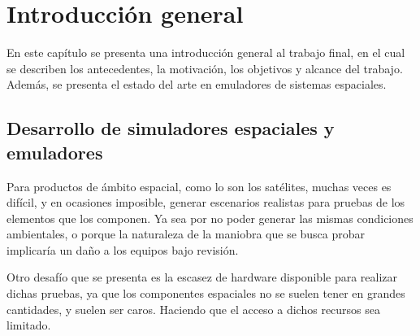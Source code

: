 
\chapter{Introducción general} %

\label{Chapter1} %
\label{IntroGeneral}


\newcommand{\keyword}[1]{\textbf{#1}}
\newcommand{\tabhead}[1]{\textbf{#1}}
\newcommand{\code}[1]{\texttt{#1}}
\newcommand{\file}[1]{\texttt{\bfseries#1}}
\newcommand{\option}[1]{\texttt{\itshape#1}}
\newcommand{\grados}{$^{\circ}$}


En este capítulo se presenta una introducción general al trabajo final, en el cual se describen los antecedentes, la motivación, los objetivos y alcance del trabajo. Además, se presenta el estado del arte en emuladores de sistemas espaciales.

\section{Desarrollo de simuladores espaciales y emuladores}
\label{sec:desarrollo_simuladores_emuladores}


Para productos de ámbito espacial, como lo son los satélites, muchas veces es difícil, y en ocasiones imposible, generar escenarios realistas para pruebas de los elementos que los componen. Ya sea por no poder generar las mismas condiciones ambientales, o porque la naturaleza de la maniobra que se busca probar implicaría un daño a los equipos bajo revisión.

Otro desafío que se presenta es la escasez de hardware disponible para realizar dichas pruebas, ya que los componentes espaciales no se suelen tener en grandes cantidades, y suelen ser caros. Haciendo que el acceso a dichos recursos sea limitado.

